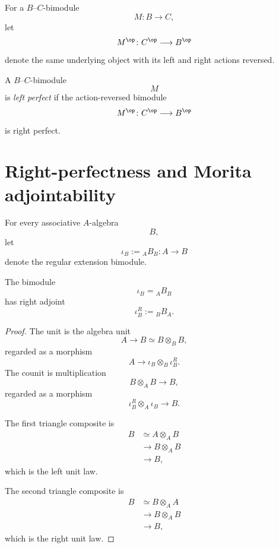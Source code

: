 \begin{definition}
\label{def:action-reversal-bimodule}
For a $B$--$C$-bimodule
\[
    M
    \colon
    B
    \longrightarrow
    C,
\]
let
\[
    M^{\op}
    \colon
    C^{\op}
    \longrightarrow
    B^{\op}
\]
denote the same underlying object with its left and right actions
reversed.
\end{definition}

\begin{definition}
\label{def:left-perfect-bimodule}
A $B$--$C$-bimodule
\[
    M
\]
is \emph{left perfect} if the action-reversed bimodule
\[
    M^{\op}
    \colon
    C^{\op}
    \longrightarrow
    B^{\op}
\]
is right perfect.
\end{definition}

\section{Right-perfectness and Morita adjointability}
\label{sec:right-perfectness-morita-adjointability}

For every associative $A$-algebra
\[
    B,
\]
let
\[
    \iota_B
    :=
    {}_A B_B
    \colon
    A
    \longrightarrow
    B
\]
denote the regular extension bimodule.

\begin{lemma}
\label{lem:regular-extension-adjunction}
The bimodule
\[
    \iota_B
    =
    {}_A B_B
\]
has right adjoint
\[
    \iota_B^R
    :=
    {}_B B_A.
\]
\end{lemma}

\begin{proof}
The unit is the algebra unit
\[
    A
    \longrightarrow
    B
    \simeq
    B\otimes_B B,
\]
regarded as a morphism
\[
    A
    \longrightarrow
    \iota_B\otimes_B\iota_B^R.
\]
The counit is multiplication
\[
    B\otimes_A B
    \longrightarrow
    B,
\]
regarded as a morphism
\[
    \iota_B^R\otimes_A\iota_B
    \longrightarrow
    B.
\]

The first triangle composite is
\[
\begin{aligned}
    B
    &\simeq
    A\otimes_A B
    \\
    &\longrightarrow
    B\otimes_A B
    \\
    &\longrightarrow
    B,
\end{aligned}
\]
which is the left unit law.

The second triangle composite is
\[
\begin{aligned}
    B
    &\simeq
    B\otimes_A A
    \\
    &\longrightarrow
    B\otimes_A B
    \\
    &\longrightarrow
    B,
\end{aligned}
\]
which is the right unit law.
\end{proof}

